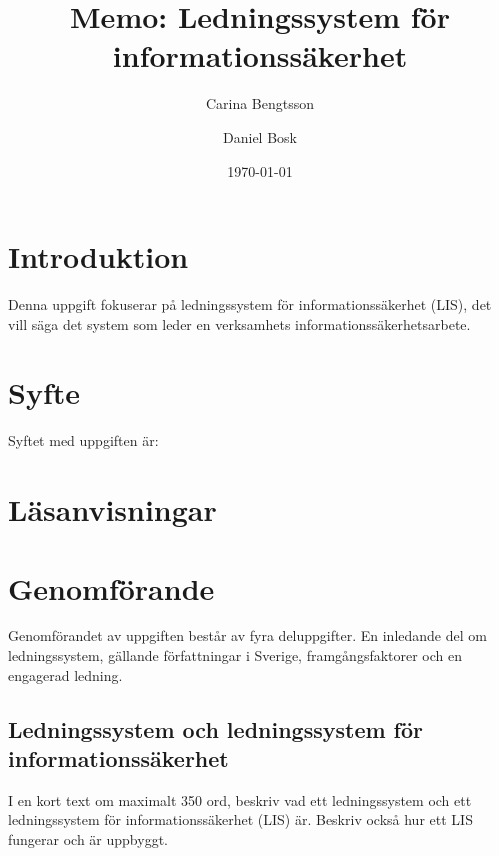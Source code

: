 \documentclass[a4paper]{llncs}
\begin{document}
\title{Memo: Ledningssystem för informationssäkerhet}
\author{%
  Carina Bengtsson
  \and
  Daniel Bosk
}
\date{\today}

\maketitle


\section{Introduktion}
\label{sec:introduction}
\noindent
Denna uppgift fokuserar på ledningssystem för informationssäkerhet (LIS), det 
vill säga det system som leder en verksamhets informationssäkerhetsarbete.


\section{Syfte}
\label{sec:aim}
\noindent
Syftet med uppgiften är:
\begin{itemize}
  
\end{itemize}


\section{Läsanvisningar}
\noindent



\section{Genomförande}\label{Work}
\noindent
Genomförandet av uppgiften består av fyra deluppgifter.
En inledande del om ledningssystem, gällande författningar i Sverige, 
framgångsfaktorer och en engagerad ledning.

\subsection{Ledningssystem och ledningssystem för informationssäkerhet}
\noindent
I en kort text om maximalt 350 ord, beskriv vad ett ledningssystem och ett 
ledningssystem för informationssäkerhet (LIS) är.
Beskriv också hur ett LIS fungerar och är uppbyggt.
\end{document}
